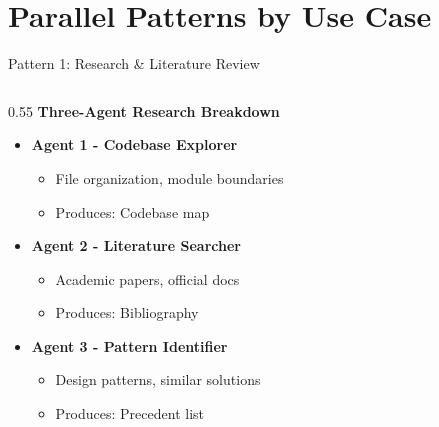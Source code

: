 \documentclass[aspectratio=169,11pt]{beamer}
\begin{document}
\section{Parallel Patterns by Use Case}

\begin{frame}{Pattern 1: Research \& Literature Review}
    \begin{columns}[T]
        \begin{column}{0.55\textwidth}
            \textbf{Three-Agent Research Breakdown}
            \begin{itemize}
                \item \textcolor{UofSCGarnet}{\textbf{Agent 1 - Codebase Explorer}}
                    \begin{itemize}
                        \footnotesize
                        \item File organization, module boundaries
                        \item Produces: Codebase map
                    \end{itemize}
                \item \textcolor{UofSCAtlantic}{\textbf{Agent 2 - Literature Searcher}}
                    \begin{itemize}
                        \footnotesize
                        \item Academic papers, official docs
                        \item Produces: Bibliography
                    \end{itemize}
                \item \textcolor{UofSCCongaree}{\textbf{Agent 3 - Pattern Identifier}}
                    \begin{itemize}
                        \footnotesize
                        \item Design patterns, similar solutions
                        \item Produces: Precedent list
                    \end{itemize}
            \end{itemize}


\end{column}
\end{columns}
\end{frame}
\end{document}
